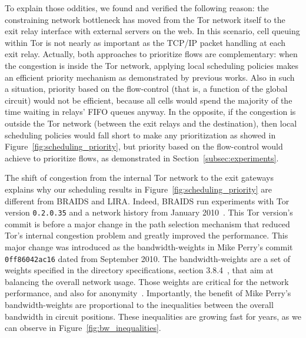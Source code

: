 To explain those oddities, we found and verified the following reason: the constraining network bottleneck has moved from the Tor network itself to the exit relay interface with external servers on the web.
In this scenario, cell queuing within Tor is not nearly as important as the TCP/IP packet handling at each exit relay.
Actually, both approaches to prioritize flows are complementary: when the congestion is inside the Tor network, applying local scheduling policies makes an efficient priority mechanism as demonstrated by previous works.
Also in such a situation, priority based on the flow-control (that is, a function of the global circuit) would not be efficient, because all cells would spend the majority of the time waiting in relays' FIFO queues anyway.
In the opposite, if the congestion is outside the Tor network (between the exit relays and the destination), then local scheduling policies would fall short to make any prioritization as showed in Figure~\ref{fig:scheduling_priority}, but priority based on the flow-control would achieve to prioritize flows, as demonstrated in Section~\ref{subsec:experiments}.

The shift of congestion from the internal Tor network to the exit gateways explains why our scheduling results in Figure~\ref{fig:scheduling_priority} are different from BRAIDS and LIRA.
Indeed, BRAIDS run experiments with Tor version \texttt{0.2.0.35} and a network history from January 2010~\cite{braids-repository}.
This Tor version's commit is before a major change in the path selection mechanism that reduced Tor's internal congestion problem and greatly improved the performance.
This major change was introduced as the bandwidth-weights in Mike Perry's commit \texttt{0ff86042ac16} dated from September 2010.
The bandwidth-weights are a set of weights specified in the directory specifications, section 3.8.4~\cite{dirspec}, that aim at balancing the overall network usage.
Those weights are critical for the network performance, and also for anonymity~\cite{waterfilling-pets2017, wf_proposal}.
Importantly, the benefit of Mike Perry's bandwidth-weights are proportional to the inequalities between the overall bandwidth in circuit positions.
These inequalities are growing fast for years, as we can observe in Figure~\ref{fig:bw_inequalities}.

